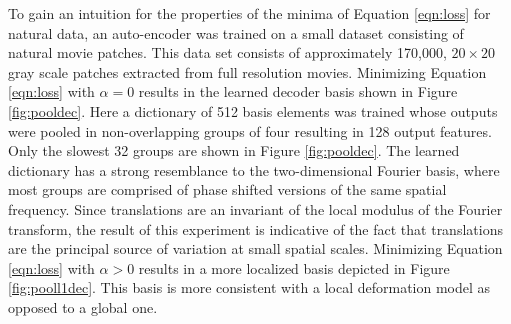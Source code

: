\documentclass{article} %
\begin{document}
To gain an intuition for the properties of the minima of Equation \ref{eqn:loss} for natural data, an auto-encoder was trained on a small dataset consisting of natural movie patches. This data set consists of approximately 170,000, $20 \times 20$ gray scale patches extracted from full resolution movies. 
Minimizing Equation \ref{eqn:loss} with $\alpha=0$ results in the learned decoder basis shown in Figure \ref{fig:pooldec}. Here a dictionary of 512 basis elements was trained whose outputs were pooled in non-overlapping groups of four resulting in 128 output features. Only the slowest 32 groups are shown in Figure \ref{fig:pooldec}. The learned dictionary has a strong resemblance to the two-dimensional Fourier basis, where most groups are comprised of phase shifted versions of the same spatial frequency. Since translations are an invariant of the local modulus of the Fourier transform, the result of this experiment is indicative of the fact that translations are the principal source of variation at small spatial scales. Minimizing Equation \ref{eqn:loss} with $\alpha > 0$ results in a more localized basis depicted in Figure \ref{fig:pooll1dec}. This basis is more consistent with a local deformation model as opposed to a global one. 
\end{document}
